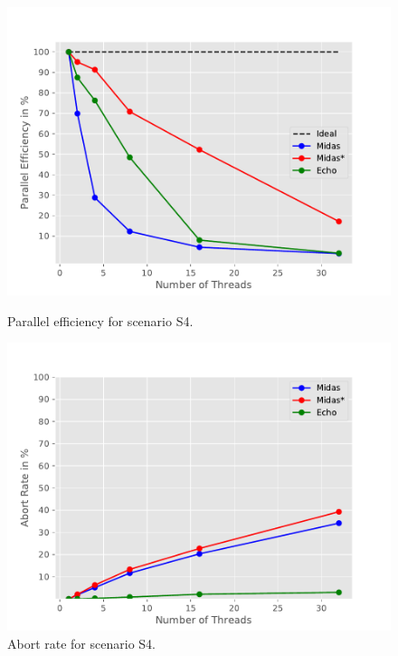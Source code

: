 \begin{figure}[h!]
\begin{minipage}[l]{0.50\textwidth}
    \includegraphics[width=\textwidth]{figures/bench/eff-ll}
    \caption{Parallel efficiency for scenario S4.}
    \label{fig:eff-s4}
\end{minipage}
\begin{minipage}[l]{0.50\textwidth}
    \includegraphics[width=\textwidth]{figures/bench/ar-ll}
    \caption{Abort rate for scenario S4.}
    \label{fig:ar-s4}
\end{minipage}
\end{figure}


